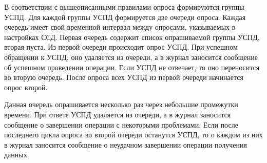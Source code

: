 В соответствии с вышеописанными правилами опроса формируются группы УСПД. Для каждой группы УСПД формируется две очереди опроса. Каждая очередь имеет свой временной интервал между опросами, указываемых в настройках ССД. Первая очередь содержит список опрашиваемой группы УСПД, вторая пуста. Из первой очереди происходит опрос УСПД. При успешном обращении к УСПД, оно удаляется из очереди, а в журнал заносится сообщение об успешном проведении операции. Если УСПД не отвечает, то оно переносится во вторую очередь. После опроса всех УСПД из первой очереди начинается опрос второй.

Данная очередь опрашивается несколько раз через небольшие промежутки времени. При ответе УСПД удаляется из очереди, а в журнал заносится сообщение о завершении операции с некоторыми проблемами. Если после последнего цикла опроса во второй очереди останутся УСПД, то о каждом из них в журнал заносится сообщение о неудачном завершении операции получения данных.